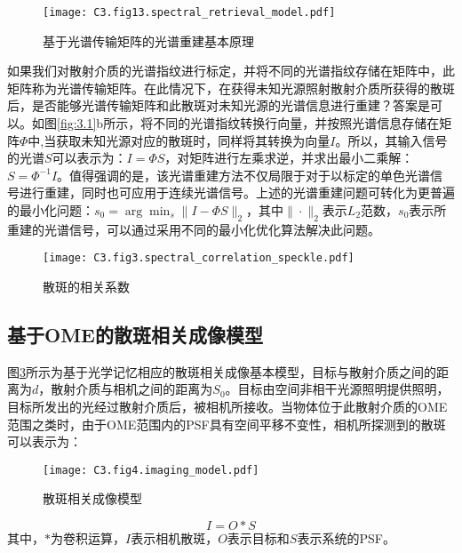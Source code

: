 \begin{figure}[htp]
	\centering
	\texttt{[image: C3.fig13.spectral\_retrieval\_model.pdf]}
	\caption{基于光谱传输矩阵的光谱重建基本原理}
	\label{fig:3.2}
\end{figure}

如果我们对散射介质的光谱指纹进行标定，并将不同的光谱指纹存储在矩阵中，此矩阵称为光谱传输矩阵。在此情况下，在获得未知光源照射散射介质所获得的散斑后，是否能够光谱传输矩阵和此散斑对未知光源的光谱信息进行重建？答案是可以。如图\ref{fig:3.1}b所示，将不同的光谱指纹转换行向量，并按照光谱信息存储在矩阵$\Phi$中,当获取未知光源对应的散斑时，同样将其转换为向量$I$。所以，其输入信号的光谱$S$可以表示为：$I={\Phi}S$，对矩阵进行左乘求逆，并求出最小二乘解：$S={\Phi}^{-1}I$。值得强调的是，该光谱重建方法不仅局限于对于以标定的单色光谱信号进行重建，同时也可应用于连续光谱信号。上述的光谱重建问题可转化为更普遍的最小化问题：$s_{0}=\arg{\min_s \| I -{\Phi}S \|_2}$，其中$\| \cdot \|_2$表示$L_2$范数，$s_{0}$表示所重建的光谱信号，可以通过采用不同的最小化优化算法解决此问题。
\begin{figure}[htp]
	\centering
	\texttt{[image: C3.fig3.spectral\_correlation\_speckle.pdf]}
	\caption{散斑的相关系数}
	\label{fig:3.3}
\end{figure}
\subsection{基于OME的散斑相关成像模型}
图\ref{fig:3.4}所示为基于光学记忆相应的散斑相关成像基本模型，目标与散射介质之间的距离为$d$，散射介质与相机之间的距离为$S_{0}$。目标由空间非相干光源照明提供照明，目标所发出的光经过散射介质后，被相机所接收。当物体位于此散射介质的OME范围之类时，由于OME范围内的PSF具有空间平移不变性，相机所探测到的散斑可以表示为：
\begin{figure}[htp]
	\centering
	\texttt{[image: C3.fig4.imaging\_model.pdf]}
	\caption{散斑相关成像模型}
	\label{fig:3.4}
\end{figure}

\begin{equation}
    I = O*S
\label{eq:speckle_autocorrelation_imgaing}
\end{equation}其中，$*$为卷积运算，$I$表示相机散斑，$O$表示目标和$S$表示系统的PSF。

